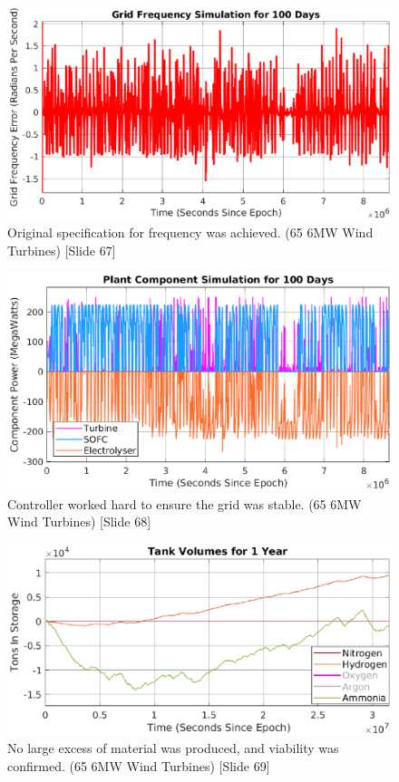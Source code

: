 
\begin{figure}
\centering
        \includegraphics[scale=0.85]{images/results/omega100day.eps}
    \caption{Original specification for frequency was achieved. (65 6MW Wind Turbines) [Slide 67]}
        \label{fig:grid}
\end{figure}
\begin{figure}
\centering
        \includegraphics[scale=0.85]{images/results/comp100day.eps}
    \caption{Controller worked hard to ensure the grid was stable. (65 6MW Wind Turbines) [Slide 68]}
        \label{fig:grid}
\end{figure}
\begin{figure}
\centering
        \includegraphics[scale=0.85]{images/results/tanks.eps}
    \caption{No large excess of material was produced, and viability was confirmed. (65 6MW Wind Turbines) [Slide 69]}
        \label{fig:grid}
\end{figure}